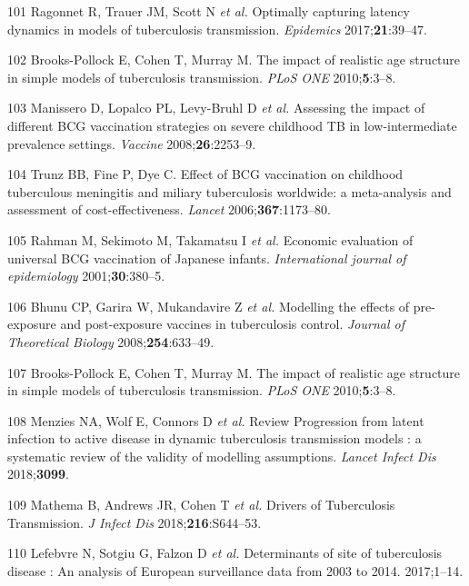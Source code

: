 \documentclass[11pt,twoside]{bristolthesis}
\begin{document}
  \leavevmode\hypertarget{ref-Ragonnet2017}{}%
  101 Ragonnet R, Trauer JM, Scott N \emph{et al.} Optimally capturing latency dynamics in models of tuberculosis transmission. \emph{Epidemics} 2017;\textbf{21}:39--47.
  
  \leavevmode\hypertarget{ref-Brooks-Pollock2010}{}%
  102 Brooks-Pollock E, Cohen T, Murray M. The impact of realistic age structure in simple models of tuberculosis transmission. \emph{PLoS ONE} 2010;\textbf{5}:3--8.
  
  \leavevmode\hypertarget{ref-Manissero2008a}{}%
  103 Manissero D, Lopalco PL, Levy-Bruhl D \emph{et al.} Assessing the impact of different BCG vaccination strategies on severe childhood TB in low-intermediate prevalence settings. \emph{Vaccine} 2008;\textbf{26}:2253--9.
  
  \leavevmode\hypertarget{ref-Trunz2006}{}%
  104 Trunz BB, Fine P, Dye C. Effect of BCG vaccination on childhood tuberculous meningitis and miliary tuberculosis worldwide: a meta-analysis and assessment of cost-effectiveness. \emph{Lancet} 2006;\textbf{367}:1173--80.
  
  \leavevmode\hypertarget{ref-Rahman2001a}{}%
  105 Rahman M, Sekimoto M, Takamatsu I \emph{et al.} Economic evaluation of universal BCG vaccination of Japanese infants. \emph{International journal of epidemiology} 2001;\textbf{30}:380--5.
  
  \leavevmode\hypertarget{ref-Bhunu2008b}{}%
  106 Bhunu CP, Garira W, Mukandavire Z \emph{et al.} Modelling the effects of pre-exposure and post-exposure vaccines in tuberculosis control. \emph{Journal of Theoretical Biology} 2008;\textbf{254}:633--49.
  
  \leavevmode\hypertarget{ref-Brooks-Pollock2010a}{}%
  107 Brooks-Pollock E, Cohen T, Murray M. The impact of realistic age structure in simple models of tuberculosis transmission. \emph{PLoS ONE} 2010;\textbf{5}:3--8.
  
  \leavevmode\hypertarget{ref-Menzies2018}{}%
  108 Menzies NA, Wolf E, Connors D \emph{et al.} Review Progression from latent infection to active disease in dynamic tuberculosis transmission models : a systematic review of the validity of modelling assumptions. \emph{Lancet Infect Dis} 2018;\textbf{3099}.
  
  \leavevmode\hypertarget{ref-Mathema2018}{}%
  109 Mathema B, Andrews JR, Cohen T \emph{et al.} Drivers of Tuberculosis Transmission. \emph{J Infect Dis} 2018;\textbf{216}:S644--53.
  
  \leavevmode\hypertarget{ref-Lefebvre2017}{}%
  110 Lefebvre N, Sotgiu G, Falzon D \emph{et al.} Determinants of site of tuberculosis disease : An analysis of European surveillance data from 2003 to 2014. 2017;1--14.
  
\end{document}
